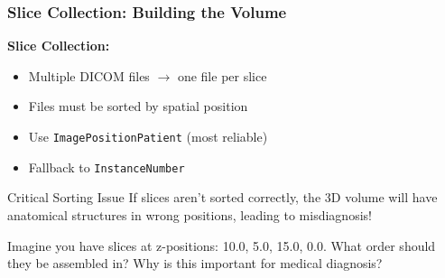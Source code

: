 \begin{frame}
\frametitle{Slice Collection: Building the Volume}

\textbf{Slice Collection:}
\begin{itemize}
  \item Multiple DICOM files $\rightarrow$ one file per slice
  \item Files must be sorted by spatial position
  \item Use \texttt{ImagePositionPatient} (most reliable)
  \item Fallback to \texttt{InstanceNumber}
\end{itemize}

\vspace{0.5cm}

\begin{alertblock}{Critical Sorting Issue}
If slices aren't sorted correctly, the 3D volume will have anatomical structures in wrong positions, leading to misdiagnosis!
\end{alertblock}

Imagine you have slices at z-positions: 10.0, 5.0, 15.0, 0.0. What order should they be assembled in? Why is this important for medical diagnosis?
\end{frame}